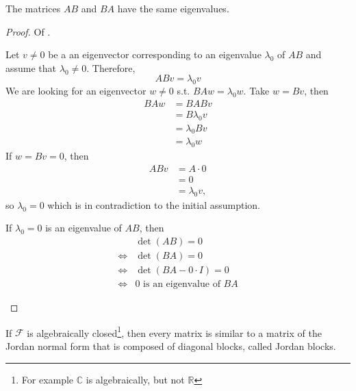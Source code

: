\begin{thm}\label{thm-ab-ba-same-eigenvalues}
	The matrices $AB$ and $BA$ have the same eigenvalues.
\end{thm}

\begin{proof}
	Of .
	\begin{flushleft}
		Let $v\neq0$ be a an eigenvector corresponding to an eigenvalue $\lambda_0$
		of $AB$ and assume that $\lambda_0\neq0$. Therefore,
		\begin{equation*}
			ABv = \lambda_0 v
		\end{equation*}
		We are looking for an eigenvector $w\neq0$ s.t. $BAw = \lambda_0 w$. Take $w=Bv$,
		then
		\begin{align*}
			BAw & = BABv          \\
			    & = B\lambda_0 v  \\
			    & = \lambda_0  Bv \\
			    & = \lambda_0 w
		\end{align*}
		If $w=Bv=0$, then
		\begin{align*}
			ABv & = A\cdot 0     \\
			    & = 0            \\
			    & = \lambda_0 v,
		\end{align*}
		so $\lambda_0=0$ which is in contradiction to the initial assumption.
	\end{flushleft}
	\begin{flushleft}
		If $\lambda_0=0$ is an eigenvalue of $AB$, then
		\begin{align*}
			 & \det(AB)=0                      \\
			\Leftrightarrow
			 & \det(BA)=0                      \\
			\Leftrightarrow
			 & \det(BA-0\cdot I)=0             \\
			\Leftrightarrow
			 & 0\text{ is an eigenvalue of }BA
		\end{align*}
	\end{flushleft}
\end{proof}

\begin{rem}
	If $\mathcal{F}$ is algebraically closed\footnote{For example $\mathbb{C}$ is
		algebraically, but not $\mathbb{R}$}, then every matrix is similar to a matrix
	of the Jordan normal form that is composed of diagonal blocks, called Jordan blocks.
\end{rem}

